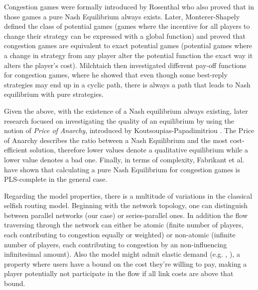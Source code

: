 \documentclass[10pt,a4paper]{book}
\theoremstyle{definition}
\theoremstyle{comment}
\begin{document}
Congestion games were formally introduced by Rosenthal \cite{Rosenthal1973ACO} who also proved that in those games a pure Nash Equilibrium always exists.
Later, Monterer-Shapely \cite{MONDERER1996124} defined the class of potential games (games where the incentive for all players to change their strategy can be expressed with a global function) and proved that congestion games are equivalent to exact potential games (potential games where a change in strategy from any player alter the potential function the exact way it alters the player's cost).
Milchtaich \cite{MILCHTAICH1996111} then investigated different pay-off functions for congestion games, where he showed that even though some best-reply strategies may end up in a cyclic path, there is always a path that leads to Nash equilibrium with pure strategies.

Given the above, with the existence of a Nash equilibrium always existing, later research focused on investigating the quality of an equilibrium by using the notion of \textit{Price of Anarchy}, introduced by Koutsoupias-Papadimitriou \cite{KOUTSOUPIAS200965}.
The Price of Anarchy describes the ratio between a Nash Equilibrium and the most cost-efficient solution, therefore lower values denote a qualitative equilibrium while a lower value denotes a bad one.
Finally, in terms of complexity, Fabrikant et al. \cite{10.1145/1007352.1007445} have shown that calculating a pure Nash Equilibrium for congestion games is PLS-complete in the general case.

Regarding the model properties, there is a multitude of variations in the classical selfish routing model.
Beginning with the network topology, one can distinguish between parallel networks (our case) or series-parallel ones.
In addition the flow traversing through the network can either be atomic (finite number of players, each contributing to congestion equally or weighted) or non-atomic (infinite number of players, each contributing to congestion by an non-influencing infinitesimal amount).
Also the model might admit elastic demand (e.g. \cite{10.1287/moor.1060.0231}, \cite{Hearn1998}), a property where users have a bound on the cost they're willing to pay, making a player potentially not participate in the flow if all link costs are above that bound.
\end{document}
